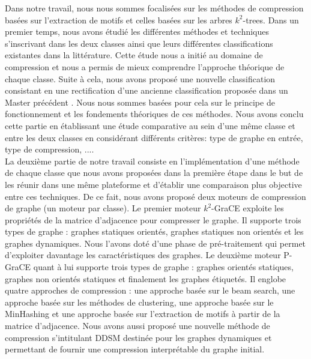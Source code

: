 \documentclass[a4paper,oneside,12pt]{report}
\theoremstyle{definition}
\begin{document}
Dans notre travail, nous nous sommes focalisées  sur les méthodes de compression basées sur l'extraction de motifs et celles basées sur les arbres $k^2$-trees. Dans un premier temps, nous avons étudié les différentes méthodes et techniques s'inscrivant dans les deux classes ainsi que leurs différentes classifications existantes dans la littérature. Cette étude nous a initié au domaine de compression et nous a permis de mieux comprendre l'approche théorique de chaque classe. Suite à cela, nous avons proposé une nouvelle classification consistant en une rectification d'une ancienne classification proposée dans un Master précédent \citep{master2017}. Nous nous sommes basées pour cela sur le principe de fonctionnement et les fondements théoriques de ces méthodes. Nous avons conclu cette partie en établissant une étude comparative au sein d'une même classe et entre les deux classes en considérant différents critères: type de graphe en entrée, type de compression, .... \\

La deuxième partie de notre travail consiste en l'implémentation d'une méthode de chaque classe que nous  avons proposées dans la première étape dans le but de les réunir dans une même plateforme et d'établir une comparaison plus objective entre ces techniques. De ce fait, nous avons proposé deux moteurs de compression de graphe (un moteur par classe). Le premier moteur $k^2$-GraCE exploite les propriétés de la matrice d'adjacence pour compresser le graphe. Il supporte trois types de graphe : graphes statiques orientés, graphes statiques non orientés et les graphes dynamiques. Nous l'avons doté d'une phase de pré-traitement qui permet d'exploiter davantage les caractéristiques des graphes. Le deuxième moteur P-GraCE quant à lui supporte trois types de graphe : graphes orientés statiques, graphes non orientés statiques et finalement les graphes étiquetés. Il englobe quatre approches de compression : une approche basée sur le beam search, une approche basée sur les méthodes de clustering, une approche basée sur le MinHashing et une approche basée sur l'extraction de motifs à partir de la matrice d'adjacence. Nous avons aussi proposé une nouvelle méthode de compression s'intitulant DDSM destinée pour les graphes dynamiques et permettant de fournir une compression interprétable du graphe initial. \\
\end{document}
